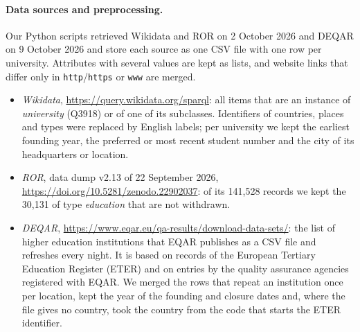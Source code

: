 \documentclass[runningheads,a4paper]{llncs}
\begin{document}
\paragraph{Data sources and preprocessing.}
Our Python scripts retrieved Wikidata and ROR on 2 October 2026 and DEQAR on 9 October 2026 and
store each source as one CSV file with one row per university. Attributes with several values
are kept as lists, and website links that differ only in \texttt{http}/\texttt{https} or
\texttt{www} are merged.
\begin{itemize}
\item \emph{Wikidata}, \url{https://query.wikidata.org/sparql}: all items that are an instance
of \emph{university} (Q3918) or of one of its subclasses. Identifiers of countries, places and
types were replaced by English labels; per university we kept the earliest founding year, the
preferred or most recent student number and the city of its headquarters or location.
\item \emph{ROR}, data dump v2.13 of 22 September 2026,
\url{https://doi.org/10.5281/zenodo.22902037}: of its 141,528 records we kept the 30,131 of
type \emph{education} that are not withdrawn.
\item \emph{DEQAR}, \url{https://www.eqar.eu/qa-results/download-data-sets/}: the list of higher
education institutions that EQAR publishes as a CSV file and refreshes every night. It is based
on records of the European Tertiary Education Register (ETER) and on entries by the quality
assurance agencies registered with EQAR. We merged the rows that repeat an institution once per
location, kept the year of the founding and closure dates and, where the file gives no country,
took the country from the code that starts the ETER identifier.
\end{itemize}
\end{document}
